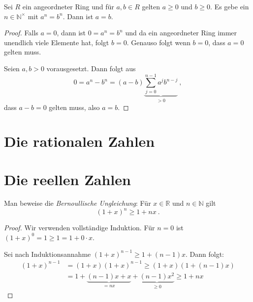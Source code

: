 \setcounter{aufgabe}{11}
\begin{aufgabe}
	Sei $R$ ein angeordneter Ring und für $a, b \in R$ gelten $a \geq 0$ und $b \geq 0$.
	Es gebe ein $n \in \mathbb N^\times$ mit $a^n = b^n$. Dann ist $a=b$.
\end{aufgabe}
\begin{proof}
	Falls $a=0$, dann ist $0 = a^n = b^n$ und da ein angeordneter Ring immer unendlich viele
	Elemente hat, folgt $b = 0$. Genauso folgt wenn $b=0$, dass $a=0$ gelten muss.

	Seien $a, b >0$ vorausgesetzt. Dann folgt aus
	\[
		0 = a^n -b^n = (a-b) \underbrace{ \sum_{j=0}^{n-1} a^j b^{n-j} }_{>0} \ ,
	\]
	dass $a-b=0$ gelten muss, also $a=b$.
\end{proof}


\section{Die rationalen Zahlen}
\section{Die reellen Zahlen}
\setcounter{aufgabe}{5}
\begin{aufgabe}
	Man beweise die \textit{Bernoullische Ungleichung}: Für $x \in \mathbb R$
	und $n \in \mathbb N$ gilt
	\[
		(1 + x)^n \geq 1 + nx \ .
	\]
\end{aufgabe}
\begin{proof}
	Wir verwenden vollständige Induktion. Für $n = 0$ ist
	$(1 + x)^0 = 1 \geq 1 = 1 + 0 \cdot x$.

	Sei nach Induktionsannahme $(1 + x)^{n-1} \geq 1 + (n-1) x$.
	Dann folgt:
	\begin{align*}
		(1 + x)^{n-1}
			&= (1 + x) (1 + x)^{n-1}
			\geq (1 + x) \left( 1 + (n-1)x \right) \\
			&= 1 + \underbrace{ (n-1) x + x}_{=nx} + \underbrace{ (n-1) x^2}_{ \geq 0}
			\geq 1 + nx
	\end{align*}
\end{proof}

